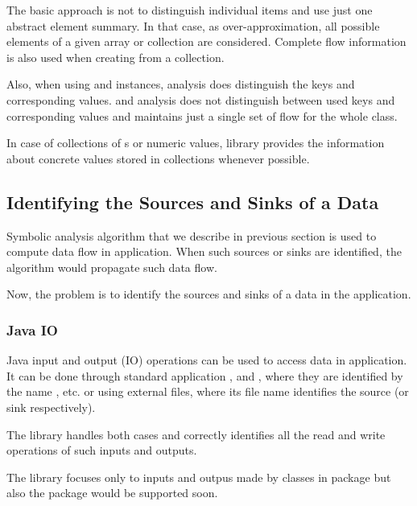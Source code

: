 The basic approach is not to distinguish individual items and use just one
abstract element summary. In that case, as over-approximation, all possible elements
of a given array or collection are considered.
Complete flow information is also used when creating 
from a collection.

Also, when using  and  instances,
analysis does distinguish the keys and corresponding values.
and 
analysis does not distinguish between used keys and corresponding values
and maintains just a single set of flow for the whole class.

In case of collections of s or numeric values, library provides
the information about concrete values stored in collections whenever possible.





\subsection{Identifying the Sources and Sinks of a Data}

Symbolic analysis algorithm that we describe in previous section is
used to compute data flow in application.
When such sources or sinks are identified, the algorithm would
propagate such data flow.

Now, the problem is to identify the sources and sinks of a data
in the application.




\subsubsection{Java IO}

Java input and output (IO) operations can be used to access data in application.
It can be done through standard application
,  and ,
where they are identified by the name , etc.
or using external files, where its file name identifies the source (or sink respectively).

The library handles both cases and correctly identifies
all the read and write operations of such inputs and outputs.

The library focuses only to inputs and outpus made by classes in  package
but also the  package would be supported soon.




